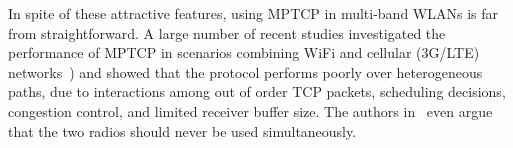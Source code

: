 In spite of these attractive features, using MPTCP in multi-band 
WLANs is far from straightforward. A large number of recent
studies investigated the performance of MPTCP in scenarios combining
WiFi and cellular (3G/LTE)
networks~\cite{raiciu:nsdi2012,saha:mobiwac2017})
and showed that the protocol performs poorly over heterogeneous paths,
due to interactions among out of order TCP packets, scheduling
decisions, congestion control, and limited receiver buffer size. 
The authors in~\cite{sur:mobicom2017,nguyen:vtc2017} even argue that the two
radios should never be used simultaneously.

